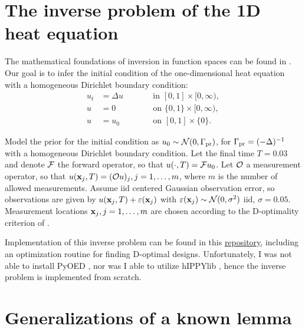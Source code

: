 \documentclass[review,supplement,hidelinks,onefignum,onetabnum]{siamart220329}
\begin{document}
\maketitle


\section{The inverse problem of the 1D heat equation}\label{section:example}
The mathematical foundations of inversion in function spaces can be
found in \cite{Stuart10}. Our goal is to infer the initial condition of
the one-dimensional heat equation with a homogeneous Dirichlet
boundary condition:
\begin{subequations}\label{eq:heat equation}
  \begin{alignat}{2}
    u_t &= \Delta u &&\qquad \text{in } [0,1] \times [0,\infty),\\
      u &= 0 &&\qquad \text{on } \{0, 1\} \times [0,\infty),\\
        u &= u_0 &&\qquad \text{on }[0,1] \times \{0\}.
  \end{alignat}
\end{subequations}

Model the prior for the initial condition as $u_0 \sim
\mathcal{N}(0,\Gamma_{\textup{pr}})$, for $\Gamma_{\textup{pr}} = (-\Delta)^{-1}$ with a homogeneous
Dirichlet boundary condition. Let the final time $T = 0.03$ and denote
$\mathcal{F}$ the forward operator, so that $u(\cdot, T) = \mathcal{F} u_0$. Let
$\mathcal{O}$ a measurement operator, so that $u(\mathbf{x}_j,T) = (\mathcal{O} u)_j,
j=1,\dots,m$, where $m$ is the number of allowed measurements. Assume
iid centered Gaussian observation error, so observations are given by
$u(\mathbf{x}_j,T) + \varepsilon(\mathbf{x}_j)$ with $\varepsilon(\mathbf{x}_j) \sim \mathcal{N}(0, \sigma^2)$
iid, $\sigma = 0.05$. Measurement locations $\mathbf{x}_j,j=1,\dots,m$ are
chosen according to the D-optimality criterion of
\cite{AlexanderianGloorGhattas14}.

Implementation of this inverse problem can be found in this 
\href{https://github.com/yairdaon/OED}{repository}, including an optimization
routine for finding D-optimal designs. Unfortunately, I was not able
to install PyOED \cite{attia2023pyoed}, nor was I able to utilize
hIPPYlib \cite{VillaPetraGhattas16, VillaPetraGhattas18,
  VillaPetraGhattas21}, hence the inverse problem is implemented from
scratch.

\section{Generalizations of a known lemma}
\end{document}
